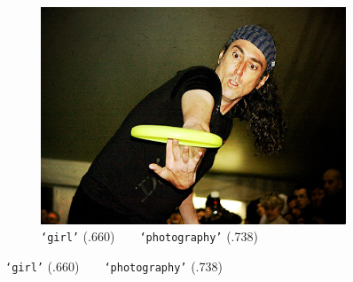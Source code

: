 {\begin{landscape}
\begin{figure}[th]
\begin{subfigure}{.3\linewidth}
    \end{subfigure}
    \hfill
    \begin{subfigure}{.3\linewidth}
        \centering
        \includegraphics[width=.8\linewidth]{evolution-man}
        \caption{\footnotesize \texttt{`girl'} (.660)~~\ra{}~~\texttt{`photography'} (.738)}
    \end{subfigure}
    
    \bigskip
    

\end{figure}
\end{landscape}}
